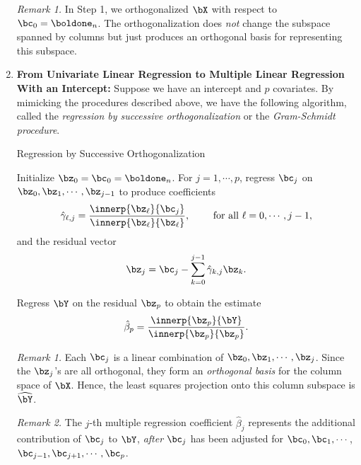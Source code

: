 \documentclass[12pt]{article}
\begin{document}
\begin{enumerate}[label=\textbf{\arabic*.}]
	\textit{Remark 1.} In Step 1, we orthogonalized $\bX$ with respect to $\bc_0 = \boldone_n$. The orthogonalization does \emph{not} change the subspace spanned by columns but just produces an orthogonal basis for representing this subspace. 
	
	\item \textbf{From Univariate Linear Regression to Multiple Linear Regression With an Intercept:} Suppose we have an intercept and $p$ covariates. By mimicking the procedures described above, we have the following algorithm, called the \textit{regression by successive orthogonalization} or the \textit{Gram-Schmidt procedure}. 
	
	\begin{minipage}{\linewidth}
	\begin{algorithm}[H]
		\caption{Regression by Successive Orthogonalization}\label{suc.ortho}
		\begin{algorithmic}[1]
			\STATE Initialize $\bz_0 = \bc_0 = \boldone_n$. 
			\STATE For $j = 1, \cdots, p$, regress $\bc_j$ on $\bz_0, \bz_1, \cdots, \bz_{j-1}$ to produce coefficients 
			\begin{align*}
				\hat{\gamma}_{\ell, j} = \frac{\innerp{\bz_\ell}{\bc_j}}{\innerp{\bz_\ell}{\bz_\ell}}, \qquad \text{ for all } \ell = 0, \cdots, j - 1, 
			\end{align*}
			and the residual vector 
			\begin{align*}
				\bz_j = \bc_j - \sum_{k=0}^{j-1} \hat{\gamma}_{k,j} \bz_k. 
			\end{align*}
			
			\STATE Regress $\bY$ on the residual $\bz_p$ to obtain the estimate 
			\begin{align}\label{eq-beta-p}
				\hat{\beta}_p = \frac{\innerp{\bz_p}{\bY}}{\innerp{\bz_p}{\bz_p}}. 
			\end{align}
		\end{algorithmic}
	\end{algorithm}
	\end{minipage}
	
	\textit{Remark 1.} Each $\bc_j$ is a linear combination of $\bz_0, \bz_1, \cdots, \bz_{j}$. Since the $\bz_j$'s are all orthogonal, they form an \emph{orthogonal basis} for the column space of $\bX$. Hence, the least squares projection onto this column subspace is $\widehat{\bY}$. 
	
	\textit{Remark 2.} The $j$-th multiple regression coefficient $\hat{\beta}_j$ represents the additional contribution of $\bc_j$ to $\bY$, \emph{after} $\bc_j$ has been adjusted for $\bc_0, \bc_1, \cdots$, $\bc_{j-1}, \bc_{j+1}, \cdots, \bc_{p}$. 
	

\end{enumerate}
\end{document}
